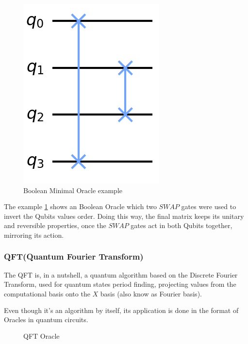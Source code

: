\documentclass{article}
\begin{document}
\newpage

\begin{figure}[h]
	\centering
	\includegraphics[scale=0.3]{minimal-oracle.png}
	\caption{Boolean Minimal Oracle example}
	\label{fig:minimal-oracle}
\end{figure}

The example \ref{fig:minimal-oracle} shows an Boolean Oracle which two $SWAP$ gates were used to invert the Qubits values order. Doing this way, the final matrix keeps its unitary and reversible properties, once the  $SWAP$ gates act in both Qubits together, mirroring its action.


\subsubsection{QFT(Quantum Fourier Transform)}
The QFT is, in a nutshell, a quantum algorithm based on the Discrete Fourier Transform, used for quantum states period finding, projecting values from the computational basis onto the $X$ basis (also know as Fourier basis).

Even though it's an algorithm by itself, its application is done in the format of Oracles in quantum circuits.


\begin{figure}[h]
	\centering
	\caption{QFT Oracle}
	\label{fig:QFT-oracle}
\end{figure}
\end{document}
